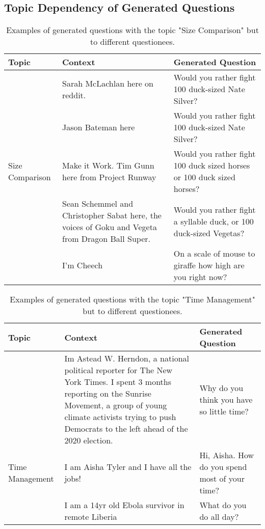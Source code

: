 \documentclass[paper=a4, fontsize=11pt]{scrartcl}
\numberwithin{equation}{section}		%
\numberwithin{figure}{section}			%
\numberwithin{table}{section}				%
\begin{document}
\subsection*{Topic Dependency of Generated Questions}
\begin{table}
  \tiny
  \centering
  \begin{tabular}{m{1.5cm}m{3.5cm}m{3.5cm}}
    \hline
    \textbf{Topic} & \textbf{Context} & \textbf{Generated Question} \\
    \hline
    \hline
     & Sarah McLachlan here on reddit. & Would you rather fight 100 duck-sized Nate Silver? \\
     \cline{2-3}
    & Jason Bateman here & Would you rather fight 100 duck-sized Nate Silver? \\
    \cline{2-3}
    Size Comparison & Make it Work. Tim Gunn here from Project Runway & Would you rather fight 100 duck sized horses or 100 duck sized horses? \\
    \cline{2-3}
    & Sean Schemmel and Christopher Sabat here, the voices of Goku and Vegeta from Dragon Ball Super.  & Would you rather fight a syllable duck, or 100 duck-sized Vegetas? \\
    \cline{2-3}
     & I'm Cheech & On a scale of mouse to giraffe how high are you right now? \\
    \hline
    \end{tabular}
  \caption{Examples of generated questions with the topic "Size Comparison" but to different questionees.}
  \label{tab:qg_examples}
\end{table}

\begin{table}
  \tiny
  \centering
  \begin{tabular}{m{1cm}m{3.5cm}m{3.5cm}}
    \hline
    \textbf{Topic} & \textbf{Context} & \textbf{Generated Question} \\
    \hline
    \hline
      & Im Astead W. Herndon, a national political reporter for The New York Times. I spent 3 months reporting on the Sunrise Movement, a group of young climate activists trying to push Democrats to the left ahead of the 2020 election. & Why do you think you have so little time? \\
      \cline{2-3}
      Time Management & I am Aisha Tyler and I have all the jobs!  & Hi, Aisha. How do you spend most of your time? \\
      \cline{2-3}
     & I am a 14yr old Ebola survivor in remote Liberia & What do you do all day? \\
    \hline
    \end{tabular}
  \caption{Examples of generated questions with the topic "Time Management" but to different questionees.}
  \label{tab:qg_examples}
\end{table}
\end{document}
